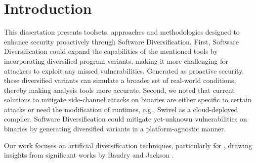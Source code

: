 
\chapter{Introduction}
\label{Intro}


This dissertation presents toolsets, approaches and methodologies designed to enhance \Wasm security proactively through Software Diversification.
First, Software Diversification could expand the capabilities of the mentioned tools by incorporating diversified program variants, making it more challenging for attackers to exploit any missed vulnerabilities.
Generated as proactive security, these diversified variants can simulate a broader set of real-world conditions, thereby making \Wasm analysis tools more accurate. 
Second, we noted that current solutions to mitigate side-channel attacks on \Wasm binaries are either specific to certain attacks or need the modification of runtimes, e.g., Swivel as a cloud-deployed compiler.
Software Diversification could mitigate yet-unknown vulnerabilities on \Wasm binaries by generating diversified variants in a platform-agnostic manner.


Our work focuses on artificial diversification techniques, particularly for \Wasm, drawing insights from significant works by Baudry \etal \cite{natural_diversity} and Jackson \etal \cite{jackson}.


